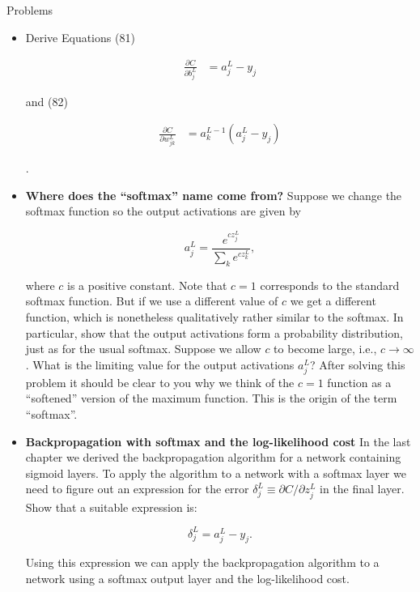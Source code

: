 \begin{exerciseBox}{Problems}


\begin{itemize}

\item 
Derive Equations (81)


\begin{align*}
\frac{\partial C}{\partial b^L_j} &= a^L_j-y_j \nonumber
\end{align*}

and (82)


\begin{align*}
\frac{\partial C}{\partial w^L_{jk}} &= a^{L-1}_k (a^L_j-y_j) \nonumber
\end{align*}

.

\item 
\textbf{Where does the ``softmax'' name come from?} Suppose we change the softmax function so the output activations are given by


\begin{equation}
a^L_j = \frac{e^{c z^L_j}}{\sum_k e^{c z^L_k}},
\tag{83}
\end{equation}

where $c$ is a positive constant. Note that $c = 1$ corresponds to the standard softmax function. But if we use a different value of $c$ we get a different function, which is nonetheless qualitatively rather similar to the softmax. In particular, show that the output activations form a probability distribution, just as for the usual softmax. Suppose we allow $c$ to become large, i.e., $c \rightarrow \infty$. What is the limiting value for the output activations $a^L_j$? After solving this problem it should be clear to you why we think of the $c = 1$ function as a ``softened'' version of the maximum function. This is the origin of the term ``softmax''.

\item 
\textbf{Backpropagation with softmax and the log-likelihood cost} In the last chapter we derived the backpropagation algorithm for a network containing sigmoid layers. To apply the algorithm to a network with a softmax layer we need to figure out an expression for the error $\delta^L_j \equiv \partial C / \partial z^L_j$ in the final layer. Show that a suitable expression is:


\begin{equation}
\delta^L_j = a^L_j -y_j.
\tag{84}
\end{equation}

Using this expression we can apply the backpropagation algorithm to a network using a softmax output layer and the log-likelihood cost.

\end{itemize}

\end{exerciseBox}




